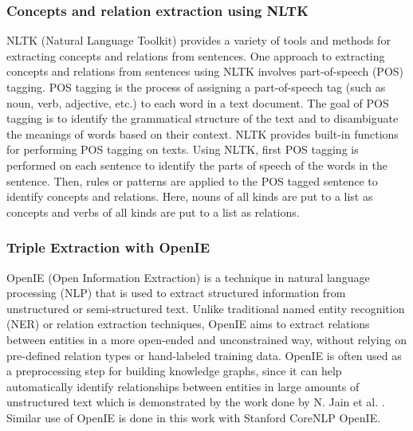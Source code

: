\subsubsection{Concepts and relation extraction using NLTK}
NLTK (Natural Language Toolkit) provides a variety of tools and methods for extracting concepts and relations from sentences. One approach to extracting concepts and relations from sentences using NLTK involves part-of-speech (POS) tagging. POS tagging is the process of assigning a part-of-speech tag (such as noun, verb, adjective, etc.) to each word in a text document. The goal of POS tagging is to identify the grammatical structure of the text and to disambiguate the meanings of words based on their context. NLTK provides built-in functions for performing POS tagging on texts. Using NLTK, first POS tagging is performed on each sentence to identify the parts of speech of the words in the sentence. Then, rules or patterns are applied to the POS tagged sentence to identify concepts and relations. Here, nouns of all kinds are put to a list as concepts and verbs of all kinds are put to a list as relations. \cite{nltkbook}

\subsubsection{Triple Extraction with OpenIE}
OpenIE (Open Information Extraction) is a technique in natural language processing (NLP) that is used to extract structured information from unstructured or semi-structured text. Unlike traditional named entity recognition (NER) or relation extraction techniques, OpenIE aims to extract relations between entities in a more open-ended and unconstrained way, without relying on pre-defined relation types or hand-labeled training data. OpenIE is often used as a preprocessing step for building knowledge graphs, since it can help automatically identify relationships between entities in large amounts of unstructured text which is demonstrated by the work done by N. Jain et al. \cite{text2kg}. Similar use of OpenIE is done in this work with Stanford CoreNLP OpenIE.

